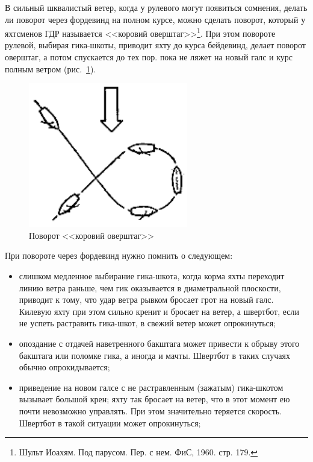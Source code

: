 \documentclass[a4paper, 12pt, twoside, final]{scrbook}
\begin{document}
В сильный шквалистый ветер, когда у рулевого могут появиться сомнения, делать ли поворот через фордевинд на полном курсе, можно сделать поворот, который у яхтсменов ГДР называется <<коровий оверштаг>>\footnote{Шульт Иоахям. Под парусом. Пер. с нем. ФиС, 1960. стр. 179.}. При этом повороте рулевой, выбирая гика-шкоты, приводит яхту до курса бейдевинд, делает поворот оверштаг, а потом спускается до тех пор. пока не ляжет на новый галс и курс полным ветром (рис.~\ref{fig:111}).

\begin{figure}
	\centering
	\includegraphics[scale=1]{111_Korovij_overshtag}
	\caption{Поворот <<коровий оверштаг>>}
	\label{fig:111}
\end{figure}

При повороте через фордевинд нужно помнить о следующем:

\begin{itemize}
\item слишком медленное выбирание гика-шкота, когда корма яхты переходит линию ветра раньше, чем гик оказывается в диаметральной плоскости, приводит к тому, что удар ветра рывком бросает грот на новый галс. Килевую яхту при этом сильно кренит и бросает на ветер, а швертбот, если не успеть растравить гика-шкот, в свежий ветер может опрокинуться;
\end{itemize}

\begin{itemize}
\item опоздание с отдачей наветренного бакштага может привести к обрыву этого бакштага или поломке гика, а иногда и мачты. Швертбот в таких случаях обычно опрокидывается;
\end{itemize}

\begin{itemize}
\item приведение на новом галсе с не растравленным (зажатым) гика-шкотом вызывает большой крен; яхту так бросает на ветер, что в этот момент ею почти невозможно управлять. При этом значительно теряется скорость. Швертбот в такой ситуации может опрокинуться;
\end{itemize}
\end{document}
